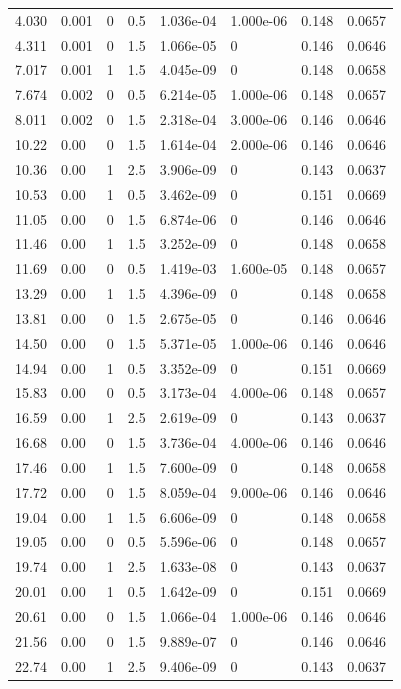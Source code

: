 \documentclass[preview]{standalone}
\begin{document}
{{\begin{tabular}{L{1.2cm}C{1.2cm} C{0.3cm}C{0.5cm} C{1.4cm}C{1.4cm} C{1.4cm}C{1.4cm}}
  4.030  &  0.001  & 0     & 0.5 &  1.036e-04  & 1.000e-06  & 0.148 &  0.0657   \\ 
  4.311  &  0.001  & 0     & 1.5 &  1.066e-05  & 0  & 0.146 &  0.0646   \\ 
  7.017  &  0.001  & 1     & 1.5 &  4.045e-09  & 0  & 0.148 &  0.0658   \\ 
  7.674  &  0.002  & 0     & 0.5 &  6.214e-05  & 1.000e-06  & 0.148 &  0.0657   \\ 
  8.011  &  0.002  & 0     & 1.5 &  2.318e-04  & 3.000e-06  & 0.146 &  0.0646   \\ 
  10.22  &  0.00  & 0     & 1.5 &  1.614e-04  & 2.000e-06  & 0.146 &  0.0646   \\ 
  10.36  &  0.00  & 1     & 2.5 &  3.906e-09  & 0  & 0.143 &  0.0637   \\ 
  10.53  &  0.00  & 1     & 0.5 &  3.462e-09  & 0  & 0.151 &  0.0669   \\ 
  11.05  &  0.00  & 0     & 1.5 &  6.874e-06  & 0  & 0.146 &  0.0646   \\ 
  11.46  &  0.00  & 1     & 1.5 &  3.252e-09  & 0  & 0.148 &  0.0658   \\ 
  11.69  &  0.00  & 0     & 0.5 &  1.419e-03  & 1.600e-05  & 0.148 &  0.0657   \\ 
  13.29  &  0.00  & 1     & 1.5 &  4.396e-09  & 0  & 0.148 &  0.0658   \\ 
  13.81  &  0.00  & 0     & 1.5 &  2.675e-05  & 0  & 0.146 &  0.0646   \\ 
  14.50  &  0.00  & 0     & 1.5 &  5.371e-05  & 1.000e-06  & 0.146 &  0.0646   \\ 
  14.94  &  0.00  & 1     & 0.5 &  3.352e-09  & 0  & 0.151 &  0.0669   \\ 
  15.83  &  0.00  & 0     & 0.5 &  3.173e-04  & 4.000e-06  & 0.148 &  0.0657   \\ 
  16.59  &  0.00  & 1     & 2.5 &  2.619e-09  & 0  & 0.143 &  0.0637   \\ 
  16.68  &  0.00  & 0     & 1.5 &  3.736e-04  & 4.000e-06  & 0.146 &  0.0646   \\ 
  17.46  &  0.00  & 1     & 1.5 &  7.600e-09  & 0  & 0.148 &  0.0658   \\ 
  17.72  &  0.00  & 0     & 1.5 &  8.059e-04  & 9.000e-06  & 0.146 &  0.0646   \\ 
  19.04  &  0.00  & 1     & 1.5 &  6.606e-09  & 0  & 0.148 &  0.0658   \\ 
  19.05  &  0.00  & 0     & 0.5 &  5.596e-06  & 0  & 0.148 &  0.0657   \\ 
  19.74  &  0.00  & 1     & 2.5 &  1.633e-08  & 0  & 0.143 &  0.0637   \\ 
  20.01  &  0.00  & 1     & 0.5 &  1.642e-09  & 0  & 0.151 &  0.0669   \\ 
  20.61  &  0.00  & 0     & 1.5 &  1.066e-04  & 1.000e-06  & 0.146 &  0.0646   \\ 
  21.56  &  0.00  & 0     & 1.5 &  9.889e-07  & 0  & 0.146 &  0.0646   \\ 
  22.74  &  0.00  & 1     & 2.5 &  9.406e-09  & 0  & 0.143 &  0.0637   \\ 
\hline 
\end{tabular} 

}}
\end{document}
